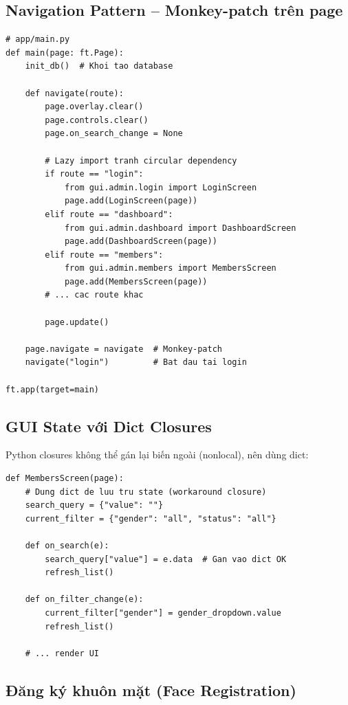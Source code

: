 \documentclass[12pt,a4paper]{article}
\begin{document}
\subsection{Navigation Pattern -- Monkey-patch trên page}

\begin{lstlisting}[style=pythonstyle, caption={Hệ thống điều hướng (routing)}]
# app/main.py
def main(page: ft.Page):
    init_db()  # Khoi tao database

    def navigate(route):
        page.overlay.clear()
        page.controls.clear()
        page.on_search_change = None

        # Lazy import tranh circular dependency
        if route == "login":
            from gui.admin.login import LoginScreen
            page.add(LoginScreen(page))
        elif route == "dashboard":
            from gui.admin.dashboard import DashboardScreen
            page.add(DashboardScreen(page))
        elif route == "members":
            from gui.admin.members import MembersScreen
            page.add(MembersScreen(page))
        # ... cac route khac

        page.update()

    page.navigate = navigate  # Monkey-patch
    navigate("login")         # Bat dau tai login

ft.app(target=main)
\end{lstlisting}

\subsection{GUI State với Dict Closures}

Python closures không thể gán lại biến ngoài (nonlocal), nên dùng dict:

\begin{lstlisting}[style=pythonstyle, caption={Quản lý state trong GUI}]
def MembersScreen(page):
    # Dung dict de luu tru state (workaround closure)
    search_query = {"value": ""}
    current_filter = {"gender": "all", "status": "all"}

    def on_search(e):
        search_query["value"] = e.data  # Gan vao dict OK
        refresh_list()

    def on_filter_change(e):
        current_filter["gender"] = gender_dropdown.value
        refresh_list()

    # ... render UI
\end{lstlisting}

\subsection{Đăng ký khuôn mặt (Face Registration)}
\end{document}
